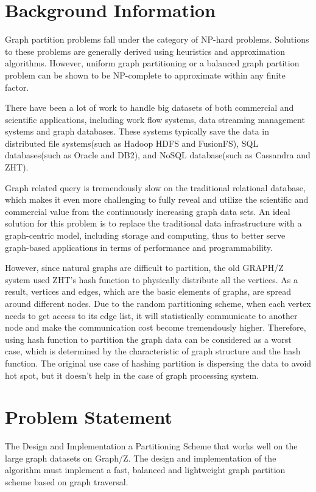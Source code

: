 \documentclass[10pt]{article}
\begin{document}
\begin{multicols}{2} 
  \section{Background Information}
  Graph partition problems fall under the category of NP-hard problems. Solutions to these problems are generally derived using heuristics and approximation algorithms. However, uniform graph partitioning or a balanced graph partition problem can be shown to be NP-complete to approximate within any finite factor.

  There have been a lot of work to handle big datasets of both commercial and scientific applications, including work flow systems, data streaming management systems and graph databases. These systems typically save the data in distributed file systems(such as Hadoop HDFS and FusionFS), SQL databases(such as Oracle and DB2), and NoSQL database(such as Cassandra and ZHT).

  Graph related query is tremendously slow on the traditional relational database, which makes it even more challenging to fully reveal and utilize the scientific and commercial value from the continuously increasing graph data sets. An ideal solution for this problem is to replace the traditional data infrastructure with a graph-centric model, including storage and computing, thus to better serve graph-based applications in terms of performance and programmability.

  However, since natural graphs are difficult to partition, the old GRAPH/Z system used ZHT’s hash function to physically distribute all the vertices. As a result, vertices and edges, which are the basic elements of graphs, are spread around different nodes. Due to the random partitioning scheme, when each vertex needs to get access to its edge list, it will statistically communicate to another node and make the communication cost become tremendously higher. Therefore, using hash function to partition the graph data can be considered as a worst case, which is determined by the characteristic of graph structure and the hash function. The original use case of hashing partition is dispersing the data to avoid hot spot, but it doesn’t help in the case of graph processing system.

  
  \section{Problem Statement}
  The Design and Implementation a Partitioning Scheme that works well on the large graph datasets on Graph/Z. The design and implementation of the algorithm must implement a fast, balanced and lightweight graph partition scheme based on graph traversal.
  

\end{multicols}
\end{document}
